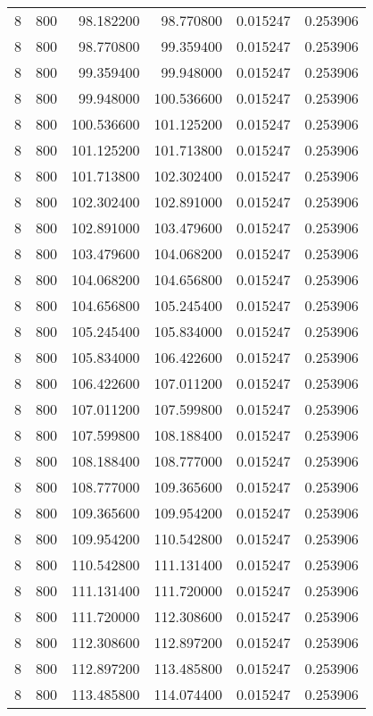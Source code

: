 \begin{longtable}{rrrrrr}
8 & 800 & 98.182200 & 98.770800 & 0.015247 & 0.253906 \\
8 & 800 & 98.770800 & 99.359400 & 0.015247 & 0.253906 \\
8 & 800 & 99.359400 & 99.948000 & 0.015247 & 0.253906 \\
8 & 800 & 99.948000 & 100.536600 & 0.015247 & 0.253906 \\
8 & 800 & 100.536600 & 101.125200 & 0.015247 & 0.253906 \\
8 & 800 & 101.125200 & 101.713800 & 0.015247 & 0.253906 \\
8 & 800 & 101.713800 & 102.302400 & 0.015247 & 0.253906 \\
8 & 800 & 102.302400 & 102.891000 & 0.015247 & 0.253906 \\
8 & 800 & 102.891000 & 103.479600 & 0.015247 & 0.253906 \\
8 & 800 & 103.479600 & 104.068200 & 0.015247 & 0.253906 \\
8 & 800 & 104.068200 & 104.656800 & 0.015247 & 0.253906 \\
8 & 800 & 104.656800 & 105.245400 & 0.015247 & 0.253906 \\
8 & 800 & 105.245400 & 105.834000 & 0.015247 & 0.253906 \\
8 & 800 & 105.834000 & 106.422600 & 0.015247 & 0.253906 \\
8 & 800 & 106.422600 & 107.011200 & 0.015247 & 0.253906 \\
8 & 800 & 107.011200 & 107.599800 & 0.015247 & 0.253906 \\
8 & 800 & 107.599800 & 108.188400 & 0.015247 & 0.253906 \\
8 & 800 & 108.188400 & 108.777000 & 0.015247 & 0.253906 \\
8 & 800 & 108.777000 & 109.365600 & 0.015247 & 0.253906 \\
8 & 800 & 109.365600 & 109.954200 & 0.015247 & 0.253906 \\
8 & 800 & 109.954200 & 110.542800 & 0.015247 & 0.253906 \\
8 & 800 & 110.542800 & 111.131400 & 0.015247 & 0.253906 \\
8 & 800 & 111.131400 & 111.720000 & 0.015247 & 0.253906 \\
8 & 800 & 111.720000 & 112.308600 & 0.015247 & 0.253906 \\
8 & 800 & 112.308600 & 112.897200 & 0.015247 & 0.253906 \\
8 & 800 & 112.897200 & 113.485800 & 0.015247 & 0.253906 \\
8 & 800 & 113.485800 & 114.074400 & 0.015247 & 0.253906 \\

\end{longtable}
